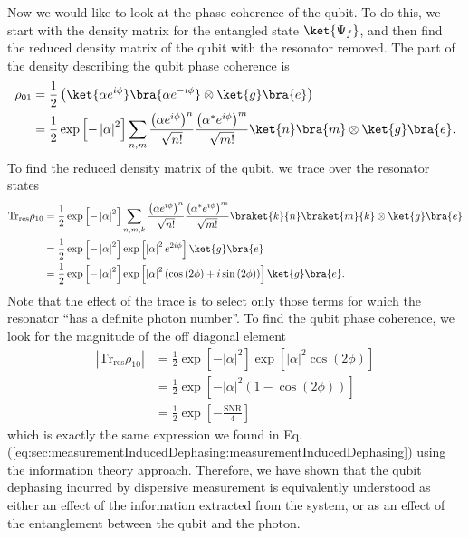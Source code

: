 Now we would like to look at the phase coherence of the qubit.
To do this, we start with the density matrix for the entangled state $\ket{\Psi_f}$, and then find the reduced density matrix of the qubit with the resonator removed.
The part of the density describing the qubit phase coherence is \begin{align}
\rho_{01} &= \frac{1}{2} \left( \ket{\alpha e^{i \phi}} \bra{\alpha e^{-i \phi}} \otimes \ket{g}\bra{e} \right) \\
&= \frac{1}{2} \exp\left[-\left| \alpha \right|^2 \right]
\sum_{n,m}
\frac{ \left( \alpha e^{i \phi} \right)^n}{\sqrt{n!}}
\frac{ \left( \alpha^* e^{i \phi} \right)^m}{\sqrt{m!}}
\ket{n}\bra{m} \otimes \ket{g}\bra{e} . \end{align}
To find the reduced density matrix of the qubit, we trace over the resonator states \begin{align}
\text{Tr}_{\text{res}}\rho_{10} &=
\frac{1}{2} \exp \left[-\left| \alpha \right|^2 \right]
\sum_{n,m,k}
\frac{ \left( \alpha e^{i \phi} \right)^n}{\sqrt{n!}}
\frac{ \left( \alpha^* e^{i \phi} \right)^m}{\sqrt{m!}} \braket{k}{n}\braket{m}{k} \otimes \ket{g}\bra{e} \\
&= \frac{1}{2} \exp \left[- \left| \alpha \right|^2 \right] \exp \left[\left| \alpha \right|^2 e^{2 i \phi} \right] \ket{g}\bra{e} \\
&= \frac{1}{2} \exp \left[- \left| \alpha \right|^2 \right] \exp \left[\left| \alpha \right|^2
\left( \cos\left( 2 \phi \right) + i \sin \left( 2 \phi \right) \right) \right] \ket{g}\bra{e} . \end{align}
Note that the effect of the trace is to select only those terms for which the resonator ``has a definite photon number''.
To find the qubit phase coherence, we look for the magnitude of the off diagonal element \begin{align}
\left| \text{Tr}_{\text{res}}\rho_{10} \right| &=
\frac{1}{2} \exp \left[- \left| \alpha \right|^2 \right] \exp \left[\left| \alpha \right|^2 \cos\left( 2 \phi \right) \right] \\
&= \frac{1}{2} \exp \left[ -\left| \alpha \right|^2 \left( 1 - \cos \left( 2\phi\right) \right) \right] \\
&= \frac{1}{2} \exp \left[ - \frac{\text{SNR}}{4} \right] \label{eq:photonLimitSNR}
\end{align}
which is exactly the same expression we found in Eq.\,(\ref{eq:sec:measurementInducedDephasing:measurementInducedDephasing}) using the information theory approach.
Therefore, we have shown that the qubit dephasing incurred by dispersive measurement is equivalently understood as either an effect of the information extracted from the system, or as an effect of the entanglement between the qubit and the photon.

